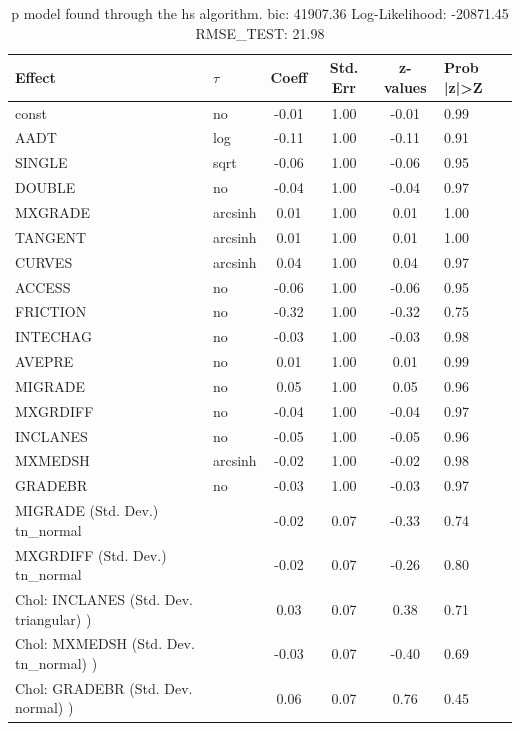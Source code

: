\begin{table}
	\caption{p model found through the hs algorithm. bic: 41907.36 Log-Likelihood: -20871.45 RMSE_TEST: 21.98}
	\begin{center}
		\begin{tabular}{|l|l|c|c|c|l|}
			\hline
			Effect & $\tau$ & Coeff & Std. Err & z-values & Prob |z|>Z \\
			\hline
			const & no & -0.01 & 1.00 & -0.01 & 0.99 \\
			\hline
			AADT & log & -0.11 & 1.00 & -0.11 & 0.91 \\
			\hline
			SINGLE & sqrt & -0.06 & 1.00 & -0.06 & 0.95 \\
			\hline
			DOUBLE & no & -0.04 & 1.00 & -0.04 & 0.97 \\
			\hline
			MXGRADE & arcsinh & 0.01 & 1.00 & 0.01 & 1.00 \\
			\hline
			TANGENT & arcsinh & 0.01 & 1.00 & 0.01 & 1.00 \\
			\hline
			CURVES & arcsinh & 0.04 & 1.00 & 0.04 & 0.97 \\
			\hline
			ACCESS & no & -0.06 & 1.00 & -0.06 & 0.95 \\
			\hline
			FRICTION & no & -0.32 & 1.00 & -0.32 & 0.75 \\
			\hline
			INTECHAG & no & -0.03 & 1.00 & -0.03 & 0.98 \\
			\hline
			AVEPRE & no & 0.01 & 1.00 & 0.01 & 0.99 \\
			\hline
			MIGRADE & no & 0.05 & 1.00 & 0.05 & 0.96 \\
			\hline
			MXGRDIFF & no & -0.04 & 1.00 & -0.04 & 0.97 \\
			\hline
			INCLANES & no & -0.05 & 1.00 & -0.05 & 0.96 \\
			\hline
			MXMEDSH & arcsinh & -0.02 & 1.00 & -0.02 & 0.98 \\
			\hline
			GRADEBR & no & -0.03 & 1.00 & -0.03 & 0.97 \\
			\hline
			MIGRADE (Std. Dev.) tn_normal &  & -0.02 & 0.07 & -0.33 & 0.74 \\
			\hline
			MXGRDIFF (Std. Dev.) tn_normal &  & -0.02 & 0.07 & -0.26 & 0.80 \\
			\hline
			 Chol: INCLANES (Std. Dev. triangular) ) &  & 0.03 & 0.07 & 0.38 & 0.71 \\
			\hline
			 Chol: MXMEDSH (Std. Dev. tn_normal) ) &  & -0.03 & 0.07 & -0.40 & 0.69 \\
			\hline
			 Chol: GRADEBR (Std. Dev. normal) ) &  & 0.06 & 0.07 & 0.76 & 0.45 \\

\end{tabular}
\end{center}
\end{table}
